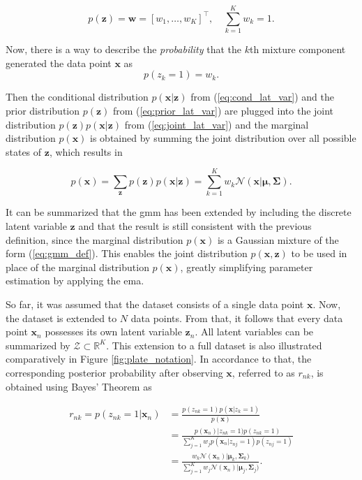 \documentclass[../../../main.tex]{subfiles}
\begin{document}
\begin{equation}\label{eq:prior_lat_var}
    p(\bm{z})=\bm{w}=[w_{1}, \dots, w_{K}]^\top, \quad \sum\limits_{k=1}^Kw_{k}=1.
\end{equation}

Now, there is a way to describe the \textit{probability} that the $k$th mixture component generated the data point $\bm{x}$ as
\begin{equation}
    p(z_k=1)=w_k.
\end{equation}


Then the conditional distribution $p(\bm{x}|\bm{z})$ from (\ref{eq:cond_lat_var}) and the prior distribution $p(\bm{z})$ from (\ref{eq:prior_lat_var}) are plugged into the joint distribution $p(\bm{z})p(\bm{x}|\bm{z})$ from (\ref{eq:joint_lat_var}) and the marginal distribution $p(\bm{x})$ is obtained by summing the joint distribution over all possible states of $\bm{z}$, which results in 

\begin{equation}\label{eq:joint_marg_lat_var}
    p(\bm{x}) = \sum\limits_{\bm{z}}p(\bm{z})p(\bm{x}|\bm{z}) = \sum\limits_{k=1}^Kw_k\mathcal{N}(\bm{x} | \bm{\mu}, \bm{\Sigma}).
\end{equation}

It can be summarized that the \gls{gmm} has been extended by including the discrete latent variable  $\bm{z}$ and that the result is still consistent with the previous definition, since the marginal distribution $p(\bm{x})$ is a Gaussian mixture of the form (\ref{eq:gmm_def}). This enables the joint distribution $p(\bm{x}, \bm{z})$ to be used in place of the marginal distribution $p(\bm{x})$, greatly simplifying parameter estimation by applying the \gls{ema}.

So far, it was assumed that the dataset consists of a single data point $\bm{x}$. Now, the dataset is extended to $N$ data points. From that, it follows that every data point $\bm{x}_n$ possesses its own latent variable $\bm{z}_n$. All latent variables can be summarized by $\mathcal{Z} \subset \mathbb{R}^K$. This extension to a full dataset is also illustrated comparatively in Figure \ref{fig:plate_notation}. In accordance to that, the corresponding posterior probability after observing $\bm{x}$, referred to as $r_{nk}$, is obtained using Bayes' Theorem as

\begin{equation}\label{eq:responsibilities}
    \begin{aligned}
        r_{nk}=p(z_{nk}=1|\bm{x}_n) &= \frac{p(z_{nk}=1)p(\bm{x} | z_k=1)}{p(\bm{x})}\\[5pt]
        &= \frac{p(\bm{x}_n) | z_{nk}=1)p(z_{nk}=1)}{\sum_{j=1}^Kw_j p(\bm{x}_n | z_{nj}=1)p(z_{nj}=1)} \\[5pt]
        &= \frac{w_k\mathcal{N}(\bm{x}_n) | \bm{\mu}_k, \bm{\Sigma}_k)}{\sum_{j=1}^Kw_j\mathcal{N}(\bm{x}_n) | \bm{\mu}_j, \bm{\Sigma}_j)}.
    \end{aligned}
\end{equation}
\end{document}
